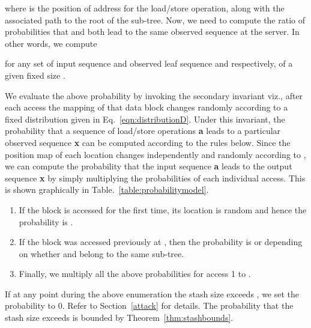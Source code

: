 \documentclass[USenglish,oneside,twocolumn]{article}
\begin{document}
where  is the position of address  for the  load/store operation, along with the associated path to the root of the sub-tree. Now, we need to compute the ratio of probabilities that  and  both lead to the same observed sequence  at the server. In other words, we compute 

for any set of input sequence and observed leaf sequence  and  respectively, of a given fixed size .


We evaluate the above probability by invoking the secondary invariant viz., after each access the mapping of that data block changes randomly according to a fixed distribution  given in Eq.~\ref{eqn:distributionD}. Under this invariant, the probability that a sequence of load/store operations \textbf{a} leads to a particular observed sequence \textbf{x} can be computed according to the rules below. Since the position map of each location changes independently and randomly according to , we can compute the probability that the input sequence \textbf{a} leads to the output sequence \textbf{x}  by simply multiplying the probabilities of each individual access. This is shown graphically in Table.~\ref{table:probabilitymodel}.
\vspace{-6pt}
\begin{enumerate}
\item If the block is accessed for the first time, its location is random and hence the probability is .
\item If the block  was accessed previously at , then the probability is  or  depending on whether  and  belong to the same sub-tree.
\item Finally, we multiply all the above probabilities for access 1 to .
\end{enumerate}
\vspace{-6pt}
If at any point during the above enumeration the stash size exceeds , we set the probability to 0. Refer to Section~\ref{attack} for details. The probability that the stash size exceeds  is bounded by Theorem~\ref{thm:stashbounds}.



\begin{table}
\centering
{}
\caption{\textbf{Demonstration of probabilities given real and observed access patterns \textbf{a, o} respectively. Different symbols for real and observed access patterns are merely for the sake of clarity. Primed symbols are used to denote leaves belonging to the same sub-tree (ex: a, a'). Only the blue symbols affect the probability of the boxed data block. The red elements show the previous and next access of the boxed data block.}}
\label{table:probabilitymodel}
\end{table}
\end{document}
